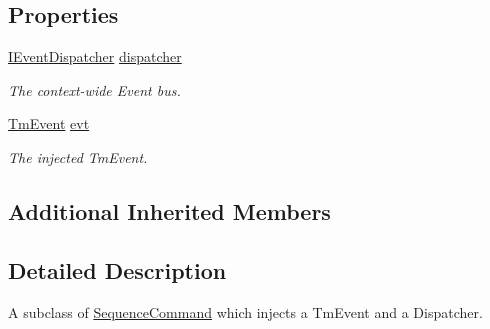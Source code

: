 \subsection*{Properties}
\begin{DoxyCompactItemize}
\item 
\hypertarget{classstrange_1_1extensions_1_1sequencer_1_1impl_1_1_event_sequence_command_a3b0bd45295ae480feb228090153e4aa4}{\hyperlink{interfacestrange_1_1extensions_1_1dispatcher_1_1eventdispatcher_1_1api_1_1_i_event_dispatcher}{I\-Event\-Dispatcher} \hyperlink{classstrange_1_1extensions_1_1sequencer_1_1impl_1_1_event_sequence_command_a3b0bd45295ae480feb228090153e4aa4}{dispatcher}}\label{classstrange_1_1extensions_1_1sequencer_1_1impl_1_1_event_sequence_command_a3b0bd45295ae480feb228090153e4aa4}

\begin{DoxyCompactList}\small\item\em The context-\/wide Event bus. \end{DoxyCompactList}\item 
\hypertarget{classstrange_1_1extensions_1_1sequencer_1_1impl_1_1_event_sequence_command_af7e2677cffa0910c775ad24805896348}{\hyperlink{classstrange_1_1extensions_1_1dispatcher_1_1eventdispatcher_1_1impl_1_1_tm_event}{Tm\-Event} \hyperlink{classstrange_1_1extensions_1_1sequencer_1_1impl_1_1_event_sequence_command_af7e2677cffa0910c775ad24805896348}{evt}}\label{classstrange_1_1extensions_1_1sequencer_1_1impl_1_1_event_sequence_command_af7e2677cffa0910c775ad24805896348}

\begin{DoxyCompactList}\small\item\em The injected Tm\-Event. \end{DoxyCompactList}\end{DoxyCompactItemize}
\subsection*{Additional Inherited Members}


\subsection{Detailed Description}
A subclass of \hyperlink{classstrange_1_1extensions_1_1sequencer_1_1impl_1_1_sequence_command}{Sequence\-Command} which injects a Tm\-Event and a Dispatcher. 

